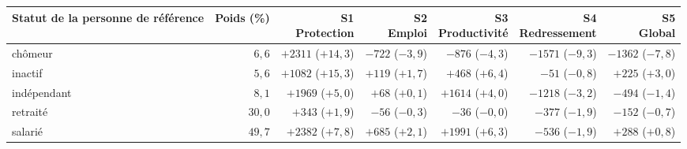 \begin{tabular}{p{4.2cm}rrrrrr}\toprule Statut de la personne de référence & Poids (\%) & \makecell{S1\\Protection} & \makecell{S2\\Emploi} & \makecell{S3\\Productivité} & \makecell{S4\\Redressement} & \makecell{S5\\Global}\\ \midrule
chômeur & $6{,}6$ & $+2311$ ($+14{,}3$) & $-722$ ($-3{,}9$) & $-876$ ($-4{,}3$) & $-1571$ ($-9{,}3$) & $-1362$ ($-7{,}8$)\\
inactif & $5{,}6$ & $+1082$ ($+15{,}3$) & $+119$ ($+1{,}7$) & $+468$ ($+6{,}4$) & $-51$ ($-0{,}8$) & $+225$ ($+3{,}0$)\\
indépendant & $8{,}1$ & $+1969$ ($+5{,}0$) & $+68$ ($+0{,}1$) & $+1614$ ($+4{,}0$) & $-1218$ ($-3{,}2$) & $-494$ ($-1{,}4$)\\
retraité & $30{,}0$ & $+343$ ($+1{,}9$) & $-56$ ($-0{,}3$) & $-36$ ($-0{,}0$) & $-377$ ($-1{,}9$) & $-152$ ($-0{,}7$)\\
salarié & $49{,}7$ & $+2382$ ($+7{,}8$) & $+685$ ($+2{,}1$) & $+1991$ ($+6{,}3$) & $-536$ ($-1{,}9$) & $+288$ ($+0{,}8$)\\\bottomrule\end{tabular}